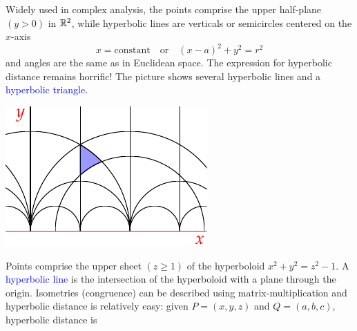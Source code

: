 \begin{minipage}[t]{0.69\linewidth}\vspace{0pt}

Widely used in complex analysis, the points comprise the upper half-plane $(y>0)$ in $\mathbb{R}^2$, while hyperbolic lines are verticals or semicircles centered on the $x$-axis
\[x=\text{constant}\quad\text{or}\quad (x-a)^2+y^2=r^2\]
and angles are the same as in Euclidean space. The expression for hyperbolic distance remains horrific! The picture shows several hyperbolic lines and a \textcolor{blue}{hyperbolic triangle.}
\end{minipage}\hfill\begin{minipage}[t]{0.3\linewidth}\vspace{0pt}
	\flushright\includegraphics{models-halfplane}
\end{minipage}




Points comprise the upper sheet $(z\ge 1)$ of the hyperboloid $x^2+y^2=z^2-1$. A \textcolor{blue}{hyperbolic line} is the intersection of the hyperboloid with a plane through the origin. Isometries (congruence) can be described using matrix-multiplication and hyperbolic distance is relatively easy: given $P=(x,y,z)$ and $Q=(a,b,c)$, hyperbolic distance is

